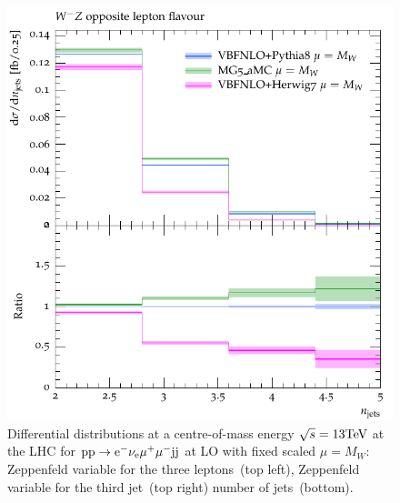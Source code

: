 \begin{figure}[htbp]
\begin{center}
   \includegraphics[scale=0.65]{figs/VBFNLO_WmZ_OF_nJets}
\caption{Differential distributions at a centre-of-mass energy $\sqrt{s}=13{\rm TeV}$ at the LHC for ${\rm p} {\rm p}
  \to {\rm e}^-  \nu_{\rm e}  \mu^+ \mu^- {\rm j} {\rm j}$ at LO with fixed scaled $\mu = M_W$: 
                Zeppenfeld variable for the three leptons~(top left),
                Zeppenfeld variable for the third jet~(top right)
                number of jets~(bottom).}
\label{vbs_fig_shower_1b}
\end{center}
\end{figure}


